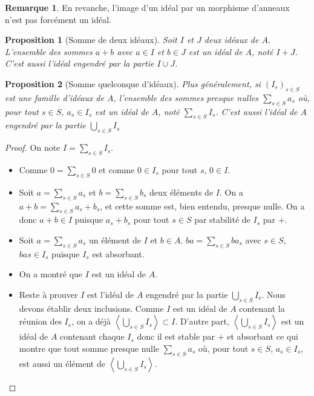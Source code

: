 \documentclass[french]{book}
\theoremstyle{plain}
\newtheorem{prop}{Proposition}[chapter]
\theoremstyle{definition}
\newtheorem{rmq}{Remarque}[chapter]
\theoremstyle{remark}
\begin{document}
\begin{rmq}
	En revanche, l'image d'un idéal par un morphisme d'anneaux n'est pas forcément un idéal.
\end{rmq}
\begin{prop}[Somme de deux idéaux]
	Soit $I$ et $J$ deux idéaux de $A$. L'ensemble des sommes $a+b$ avec $a\in I$ et $b\in J$ est un idéal de $A$, noté $I+J$. C'est aussi l'idéal engendré par la partie $I\cup J$.
\end{prop}
\begin{prop}[Somme quelconque d'idéaux]
	Plus généralement, si $(I_s)_{s\in S}$ est une famille d'idéaux de $A$, l'ensemble des sommes presque nulles $\displaystyle\sum_{s\in S}a_s$ où, pour tout $s\in S$, $a_s\in I_s$ est un idéal de $A$, noté $\displaystyle\sum_{s\in S}I_s$. C'est aussi l'idéal de $A$ engendré par la partie $\displaystyle\bigcup_{s\in S}I_s$ 
\end{prop}
\begin{proof}
	On note $I=\displaystyle\sum_{s\in S}I_s$.
	\begin{itemize}
		\item Comme $0=\displaystyle\sum_{s\in S} 0$ et comme $0\in I_s$ pour tout $s$, $0\in I$.
		\item Soit $\displaystyle a=\sum_{s\in S} a_s$ et $\displaystyle b=\sum_{s\in S} b_s$ deux éléments de $I$. On a $\displaystyle a+b=\sum_{s\in S} a_s+b_s$, et cette somme est, bien entendu, presque nulle. On a donc $a+b\in I$ puisque $a_s+b_s$ pour tout $s\in S$ par stabilité de $I_s$ par $+$.
		\item Soit $\displaystyle a=\sum_{s\in S} a_s$ un élément de $I$ et $b\in A$. $\displaystyle ba=\sum_{s\in S} ba_s$ avec $s\in S$, $bas\in I_s$ puisque $I_s$ est absorbant.
		\item On a montré que $I$ est un idéal de $A$.
		\item Reste à prouver $I$ est l'idéal de $A$ engendré par la partie $\displaystyle\bigcup_{s\in S}I_s$. Nous devons établir deux inclusions. Comme $I$ est un idéal de $A$ contenant la réunion des $I_s$, on a déjà $\displaystyle\left\langle\bigcup_{s\in S}I_s\right\rangle\subset I$. D'autre part, $\displaystyle\left\langle\bigcup_{s\in S}I_s\right\rangle$ est un idéal de $A$ contenant chaque $I_s$ donc il est stable par $+$ et absorbant ce qui montre que tout somme presque nulle $\displaystyle\sum_{s\in S}a_s$ où, pour tout $s\in S$, $a_s\in I_s$, est aussi un élément de $\displaystyle\left\langle\bigcup_{s\in S}I_s\right\rangle$.
	\end{itemize}
\end{proof}
\end{document}
